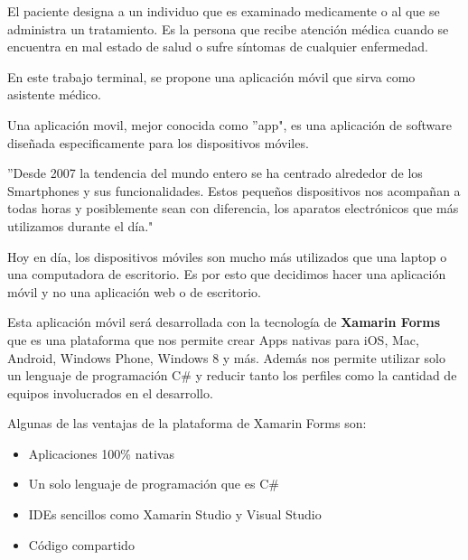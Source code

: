 El paciente designa a un individuo que es examinado medicamente o al que se administra un tratamiento\cite{Referencia5}. Es la persona que recibe atención médica cuando se encuentra en mal estado de salud o sufre síntomas de cualquier enfermedad.

En este trabajo terminal, se propone una aplicación móvil que sirva como asistente médico.

Una aplicación movil, mejor conocida como ''app", es una aplicación de software diseñada especificamente para los dispositivos móviles\cite{Referencia6}.

''Desde 2007 la tendencia del mundo entero se ha centrado alrededor de los Smartphones y sus funcionalidades. Estos pequeños dispositivos nos acompañan a todas horas y posiblemente sean con diferencia, los aparatos electrónicos que más utilizamos durante el día."\cite{Referencia7}

Hoy en día, los dispositivos móviles son mucho más utilizados que una laptop o una computadora de escritorio. Es por esto que decidimos hacer una aplicación móvil y no una aplicación web o de escritorio.

Esta aplicación móvil será desarrollada con la tecnología de \textbf{Xamarin Forms} que es una plataforma que nos permite crear Apps nativas para iOS, Mac, Android, Windows Phone, Windows 8 y más. Además nos permite utilizar solo un lenguaje de programación C\#  y  reducir tanto los perfiles como la cantidad de equipos involucrados en el desarrollo.\cite{Referencia8}

Algunas de las ventajas de la plataforma de Xamarin Forms son: 
\begin{itemize}
	\item Aplicaciones 100\% nativas
	\item Un solo lenguaje de programación que es C\#
	\item IDEs sencillos como Xamarin Studio y Visual Studio
	\item Código compartido
\end{itemize}




%
%
%

